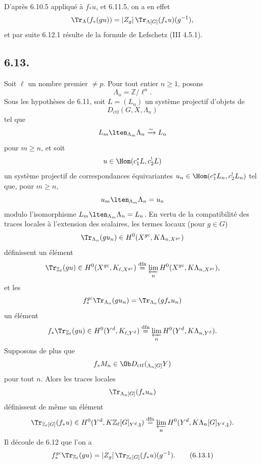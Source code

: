 D'après 6.10.5 appliqué à $f_*u$, et 6.11.5, on a en effet
\[
\Tr_{\Lambda}(f_*(gu))=|Z_g|\,\Tr_{\Lambda[G]}(f_*u)(g^{-1}),
\]
et par suite 6.12.1 résulte de la formule de Lefschetz (III 4.5.1).

\subsection*{6.13.}
Soit $\ell$ un nombre premier $\ne p$. Pour tout entier $n\ge1$, posons
\[
\Lambda_n=\mathbb{Z}/\ell^n.
\]
Sous les hypothèses de 6.11, soit $L=(L_n)$ un système projectif 
d'objets de
\[
D_{\mathrm{ctf}}(G,X,\Lambda_n)
\]
tel que
\[
L_m\lten_{\Lambda_m}\Lambda_n\xrightarrow{\sim}L_n
\]
pour $m\ge n$, et soit
\[
u\in\Hom(c_1^*L,c_2^!L)
\]
un système projectif de correspondances équivariantes $u_n\in\Hom(c_1^*L_n,c_2^!L_n)$ tel que, pour $m\ge n$,
\[
u_m\lten_{\Lambda_m}\Lambda_n=u_n
\]
modulo l'isomorphisme $L_m\lten_{\Lambda_m}\Lambda_n=L_n$. En vertu de la compatibilité des traces locales à l'extension des scalaires, les termes locaux (pour $g\in G$)
\[
\Tr_{\Lambda_n}(gu_n)\in H^0(X^{gc},K\Lambda_{n,X^{gc}})
\]
définissent un élément
\[
\Tr_{\mathbb{Z}_{\ell}}(gu)\in
H^0(X^{gc},K_{\ell,X^{gc}})
\stackrel{\mathrm{dfn}}{=}
\varprojlim_n H^0(X^{gc},K\Lambda_{n,X^{gc}}),
\]
et les
\[
f_*^{gc}\Tr_{\Lambda_n}(gu_n)=\Tr_{\Lambda_n}(gf_*u_n)
\]
un élément
\[
f_*\Tr_{\mathbb{Z}_{\ell}}(gu)\in
H^0(Y^d,K_{\ell,Y^d})
\stackrel{\mathrm{dfn}}{=}
\varprojlim_n H^0(Y^d,K\Lambda_{n,Y^d}).
\]
Supposons de plus que
\[
f_*M_n\in\Ob D_{\mathrm{ctf}}({}_{\Lambda_n[G]}Y)
\]
pour tout $n$. Alors les traces locales
\[
\Tr_{\Lambda_n[G]}(f_*u_n)
\]
définissent de même un élément
\[
\Tr_{\mathbb{Z}_{\ell}[G]}(f_*u)\in
H^0(Y^d,K\mathbb{Z}_{\ell}[G]_{Y^d,\natural})
\stackrel{\mathrm{dfn}}{=}
\varprojlim_n H^0(Y^d,K\Lambda_n[G]_{Y^d,\natural}).
\]
Il découle de 6.12 que l'on a
\begin{equation}
f_*^{gc}\Tr_{\mathbb{Z}_{\ell}}(gu)
=
|Z_g|\,\Tr_{\mathbb{Z}_{\ell}[G]}(f_*u)(g^{-1}).
\tag{6.13.1}
\end{equation}

